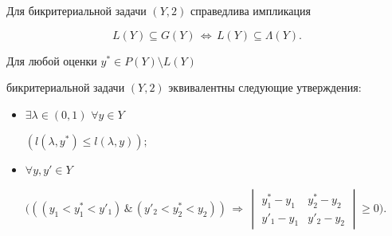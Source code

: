 \begin{lem} Для бикритериальной задачи $(Y,2)$ справедлива импликация 


$$ 


L(Y)\subseteq G(Y)\,\Longleftrightarrow\, L(Y)\subseteq 


\Lambda(Y). 


$$ 


\end{lem} 


 


\begin{lem} Для любой оценки $y^*\in P(Y)\setminus L(Y)$ 


бикритериальной задачи $(Y,2)$ эквивалентны следующие утверждения$:$ 


\begin{itemize} 


\item[(i)] $\exists\lambda\in(0,1)$\; $\forall y\in Y$ 


$(l(\lambda,y^*)\le l(\lambda,y));$ 


\item[(ii)] $\forall y,y'\in Y$ 


$\Big(((y_1<y^*_1<y'_1)\,\&\,(y'_2<y^*_2<y_2))\, 


\Longrightarrow\,\begin{vmatrix} 


y^*_1-y_1 & y^*_2-y_2 \\ y'_1-y_1 & y'_2-y_2 


\end{vmatrix}\ge 0\Big)$. 


\end{itemize}


\end{lem}


 


